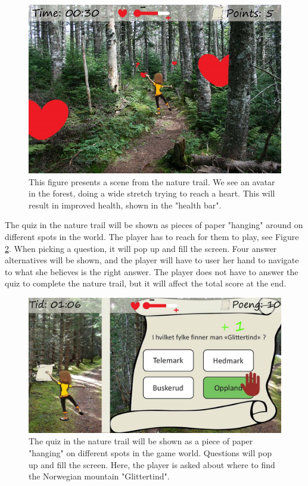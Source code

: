 \begin{figure} [H]
\centering
\includegraphics[scale=0.45]{game1engelsk.jpg}
\caption[Nature trail - stretching]{This figure presents a scene from the nature trail. We see an avatar in the forest, doing a wide stretch trying to reach a heart. This will result in improved health, shown in the "health bar".}
\label{fig:hearts}
\end{figure}

The quiz in the nature trail will be shown as pieces of paper "hanging" around on different spots in the world. The player has to reach for them to play, see Figure \ref{fig:quiz}. When picking a question, it will pop up and fill the screen. Four answer alternatives will be shown, and the player will have to user her hand to navigate to what she believes is the right answer. The player does not have to answer the quiz to complete the nature trail, but it will affect the total score at the end. 

\begin{figure} [H]
\centering
\includegraphics[scale=0.5]{quiz.jpg}
\caption[Nature trail - quiz]{The quiz in the nature trail will be shown as a piece of paper "hanging" on different spots in the game world. Questions will pop up and fill the screen. Here, the player is asked about where to find the Norwegian mountain "Glittertind".}
\label{fig:quiz}
\end{figure} 

